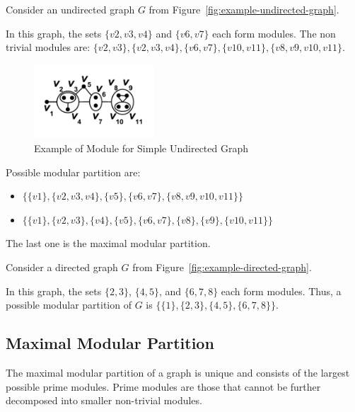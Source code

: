 \begin{myex}
    Consider an undirected graph $G$ from Figure~\ref{fig:example-undirected-graph}.

    In this graph, the sets $\{v2, v3, v4\}$ and $\{v6, v7\}$ each form modules.
    The non trivial modules are: $\{v2, v3\}, \{v2, v3, v4\}, \{v6, v7\}, \{v10, v11\}, \{v8, v9, v10, v11\}$.

    \begin{figure}[!h]
        \centering
        \includegraphics[width=0.40\textwidth]{images/graphs/undirected_graph_wikipedia_module}
        \caption{Example of Module for Simple Undirected Graph}
        \label{fig:example-undirected-graph-module}
    \end{figure}

    Possible modular partition are:
    \begin{itemize}
        \item $\{\{v1\}, \{v2, v3, v4\}, \{v5\}, \{v6, v7\}, \{v8, v9, v10, v11\}\}$
        \item $\{\{v1\}, \{v2, v3\}, \{v4\}, \{v5\}, \{v6, v7\}, \{v8\}, \{v9\}, \{v10, v11\}\}$
    \end{itemize}
    The last one is the maximal modular partition.
\end{myex}

\begin{myex}
    Consider a directed graph $G$ from Figure~\ref{fig:example-directed-graph}.

    In this graph, the sets $\{2, 3\}$, $\{4, 5\}$, and $\{6, 7, 8\}$ each form modules.
    Thus, a possible modular partition of $G$ is $\{\{1\}, \{2, 3\}, \{4, 5\}, \{6, 7, 8\}\}$.
\end{myex}

\subsection*{Maximal Modular Partition}\label{subsec:maximal-modular-partition}

The maximal modular partition of a graph is unique and consists of the largest possible prime modules.
Prime modules are those that cannot be further decomposed into smaller non-trivial modules.

